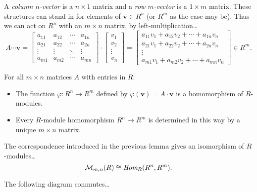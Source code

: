 A \label{vector} \emph{column $n$-vector} is a $n \times 1$ matrix and a \emph{row $m$-vector} is a $1 \times m$ matrix. These structures
can stand in for elements of $\textbf{v} \in R^n$ (or $R^m$ as the case may be). Thus we can act on $R^n$ with an $m \times n$ matrix, by
left-multiplication\dots
\[
A \cdots \textbf{v} =
\begin{bmatrix}
	a_{11} & a_{12} & \cdots & a_{1n} \\
	a_{21} & a_{22} & \cdots & a_{2n} \\
	\vdots & \vdots & \ddots & \vdots \\
	a_{m1} & a_{m2} & \cdots & a_{mn}
\end{bmatrix}
\cdot
\begin{bmatrix}
	v_{1}\\
	v_{2}\\
	\vdots\\
	v_{n}
\end{bmatrix}
=
\begin{bmatrix}
	a_{11}v_1 + a_{12}v_2 + \cdots + a_{1n}v_n\\
	a_{21}v_1 + a_{22}v_2 + \cdots + a_{2n}v_n\\
	\vdots\\
	a_{m1}v_1 + a_{m2}v_2 + \cdots + a_{mn}v_n
\end{bmatrix}
\in R^m.
\]
\begin{lemma}
For all $m \times n$ matrices $A$ with entries in $R$:
\begin{itemize}
  \item The function $\varphi : R^n \rightarrow R^m$ defined by $\varphi(\textbf{v}) = A \cdot \textbf{v}$ is a
  homomorphism of $R$-modules.
  \item Every $R$-module homomorphism $R^n \rightarrow R^m$ is determined in this way by a unique $m \times n$ matrix.
\end{itemize}
\end{lemma}

\begin{corollary}
The correspondence introduced in the previous lemma gives an isomorphism of $R$-modules\dots
$$\mathcal{M}_{m,n}(R) \cong \emph{Hom}_R(R^n,R^m).$$
\end{corollary}

\begin{lemma}
The following diagram commutes\dots
\begin{figure}[H]
\centering

\end{figure}
\end{lemma}

